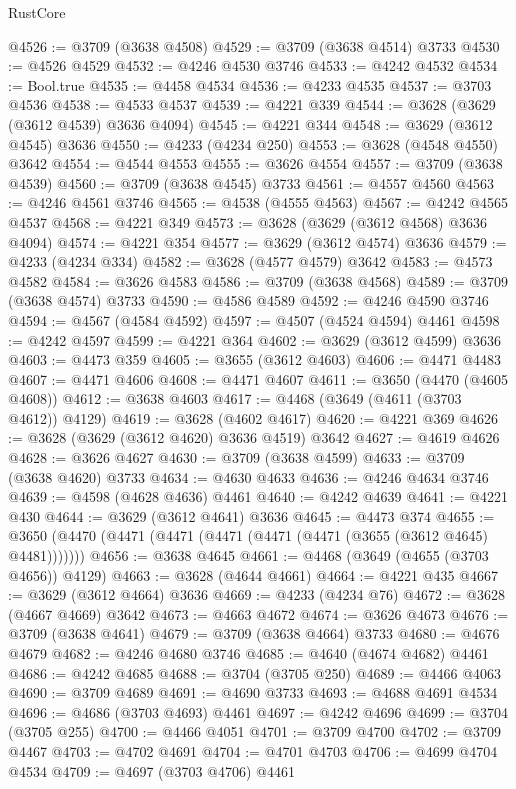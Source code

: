 \begin{lexlean}{RustCore}
\begin{coremodule}
@4526 := @3709 (@3638 @4508)
@4529 := @3709 (@3638 @4514) @3733
@4530 := @4526 @4529
@4532 := @4246 @4530 @3746
@4533 := @4242 @4532
@4534 := Bool.true
@4535 := @4458 @4534
@4536 := @4233 @4535
@4537 := @3703 @4536
@4538 := @4533 @4537
@4539 := @4221 @339
@4544 := @3628 (@3629 (@3612 @4539) @3636 @4094)
@4545 := @4221 @344
@4548 := @3629 (@3612 @4545) @3636
@4550 := @4233 (@4234 @250)
@4553 := @3628 (@4548 @4550) @3642
@4554 := @4544 @4553
@4555 := @3626 @4554
@4557 := @3709 (@3638 @4539)
@4560 := @3709 (@3638 @4545) @3733
@4561 := @4557 @4560
@4563 := @4246 @4561 @3746
@4565 := @4538 (@4555 @4563)
@4567 := @4242 @4565 @4537
@4568 := @4221 @349
@4573 := @3628 (@3629 (@3612 @4568) @3636 @4094)
@4574 := @4221 @354
@4577 := @3629 (@3612 @4574) @3636
@4579 := @4233 (@4234 @334)
@4582 := @3628 (@4577 @4579) @3642
@4583 := @4573 @4582
@4584 := @3626 @4583
@4586 := @3709 (@3638 @4568)
@4589 := @3709 (@3638 @4574) @3733
@4590 := @4586 @4589
@4592 := @4246 @4590 @3746
@4594 := @4567 (@4584 @4592)
@4597 := @4507 (@4524 @4594) @4461
@4598 := @4242 @4597
@4599 := @4221 @364
@4602 := @3629 (@3612 @4599) @3636
@4603 := @4473 @359
@4605 := @3655 (@3612 @4603)
@4606 := @4471 @4483
@4607 := @4471 @4606
@4608 := @4471 @4607
@4611 := @3650 (@4470 (@4605 @4608))
@4612 := @3638 @4603
@4617 := @4468 (@3649 (@4611 (@3703 @4612)) @4129)
@4619 := @3628 (@4602 @4617)
@4620 := @4221 @369
@4626 := @3628 (@3629 (@3612 @4620) @3636 @4519) @3642
@4627 := @4619 @4626
@4628 := @3626 @4627
@4630 := @3709 (@3638 @4599)
@4633 := @3709 (@3638 @4620) @3733
@4634 := @4630 @4633
@4636 := @4246 @4634 @3746
@4639 := @4598 (@4628 @4636) @4461
@4640 := @4242 @4639
@4641 := @4221 @430
@4644 := @3629 (@3612 @4641) @3636
@4645 := @4473 @374
@4655 := @3650 (@4470 (@4471 (@4471 (@4471 (@4471 (@4471 (@3655 (@3612 @4645) @4481)))))))
@4656 := @3638 @4645
@4661 := @4468 (@3649 (@4655 (@3703 @4656)) @4129)
@4663 := @3628 (@4644 @4661)
@4664 := @4221 @435
@4667 := @3629 (@3612 @4664) @3636
@4669 := @4233 (@4234 @76)
@4672 := @3628 (@4667 @4669) @3642
@4673 := @4663 @4672
@4674 := @3626 @4673
@4676 := @3709 (@3638 @4641)
@4679 := @3709 (@3638 @4664) @3733
@4680 := @4676 @4679
@4682 := @4246 @4680 @3746
@4685 := @4640 (@4674 @4682) @4461
@4686 := @4242 @4685
@4688 := @3704 (@3705 @250)
@4689 := @4466 @4063
@4690 := @3709 @4689
@4691 := @4690 @3733
@4693 := @4688 @4691 @4534
@4696 := @4686 (@3703 @4693) @4461
@4697 := @4242 @4696
@4699 := @3704 (@3705 @255)
@4700 := @4466 @4051
@4701 := @3709 @4700
@4702 := @3709 @4467
@4703 := @4702 @4691
@4704 := @4701 @4703
@4706 := @4699 @4704 @4534
@4709 := @4697 (@3703 @4706) @4461

\end{coremodule}
\end{lexlean}
